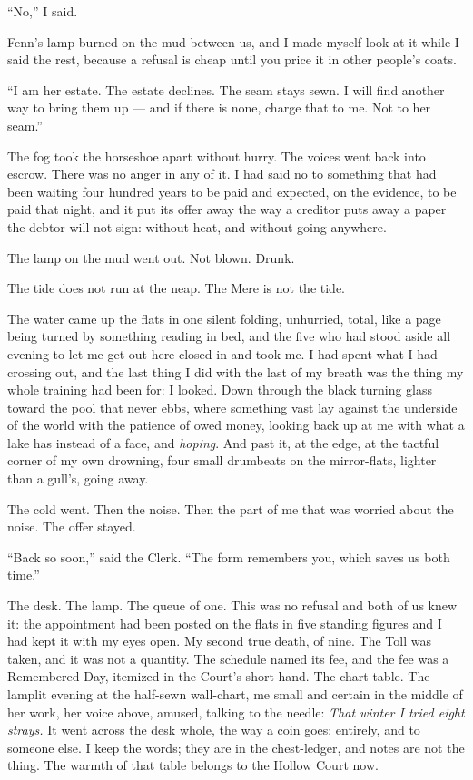 ``No,'' I said.

Fenn's lamp burned on the mud between us, and I made myself look at it while I said the rest, because a refusal is cheap until you price it in other people's coats.

``I am her estate. The estate declines. The seam stays sewn. I will find another way to bring them up --- and if there is none, charge that to me. Not to her seam.''

The fog took the horseshoe apart without hurry. The voices went back into escrow. There was no anger in any of it. I had said no to something that had been waiting four hundred years to be paid and expected, on the evidence, to be paid that night, and it put its offer away the way a creditor puts away a paper the debtor will not sign: without heat, and without going anywhere.

The lamp on the mud went out. Not blown. Drunk.

The tide does not run at the neap. The Mere is not the tide.

The water came up the flats in one silent folding, unhurried, total, like a page being turned by something reading in bed, and the five who had stood aside all evening to let me get out here closed in and took me. I had spent what I had crossing out, and the last thing I did with the last of my breath was the thing my whole training had been for: I looked. Down through the black turning glass toward the pool that never ebbs, where something vast lay against the underside of the world with the patience of owed money, looking back up at me with what a lake has instead of a face, and \emph{hoping}. And past it, at the edge, at the tactful corner of my own drowning, four small drumbeats on the mirror-flats, lighter than a gull's, going away.

The cold went. Then the noise. Then the part of me that was worried about the noise. The offer stayed.

\scenebreak

``Back so soon,'' said the Clerk. ``The form remembers you, which saves us both time.''

The desk. The lamp. The queue of one. This was no refusal and both of us knew it: the appointment had been posted on the flats in five standing figures and I had kept it with my eyes open. My second true death, of nine. The Toll was taken, and it was not a quantity. The schedule named its fee, and the fee was a Remembered Day, itemized in the Court's short hand. The chart-table. The lamplit evening at the half-sewn wall-chart, me small and certain in the middle of her work, her voice above, amused, talking to the needle: \emph{That winter I tried eight strays.} It went across the desk whole, the way a coin goes: entirely, and to someone else. I keep the words; they are in the chest-ledger, and notes are not the thing. The warmth of that table belongs to the Hollow Court now.

